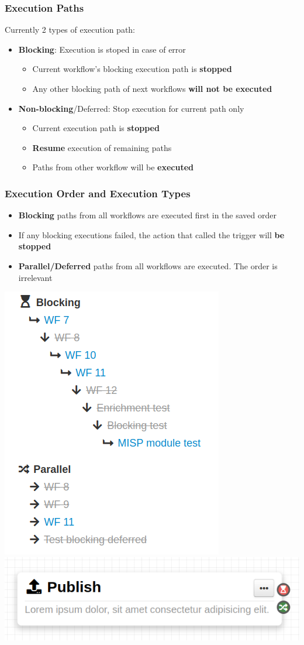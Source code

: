 \begin{frame}
    \frametitle{Execution Paths}
    Currently 2 types of execution path:
    \vspace{0.5em}
    \begin{itemize}
        \item {\bf Blocking}: Execution is stoped in case of error
        \begin{itemize}
            \item Current workflow's blocking execution path is {\bf stopped}
            \item Any other blocking path of next workflows {\bf will not be executed}
        \end{itemize}
        \vspace{0.5em}
        \item {\bf Non-blocking}/Deferred: Stop execution for current path only
        \begin{itemize}
            \item Current execution path is {\bf stopped}
            \item {\bf Resume} execution of remaining paths
            \item Paths from other workflow will be {\bf executed}
        \end{itemize}
    \end{itemize}
\end{frame}

\begin{frame}
    \frametitle{Execution Order and Execution Types}
    \begin{itemize}
        \item \textbf{Blocking} paths from all workflows are executed first in the saved order
        \item If any blocking executions failed, the action that called the trigger will \textbf{be stopped}
        \item \textbf{Parallel/Deferred} paths from all workflows are executed. The order is irrelevant
    \end{itemize}

    \begin{center}
        \includegraphics[width=0.35\linewidth]{pictures/execution-order-2.png}
        \includegraphics[width=0.40\linewidth]{pictures/trigger-outputs.png}
    \end{center}
\end{frame}

